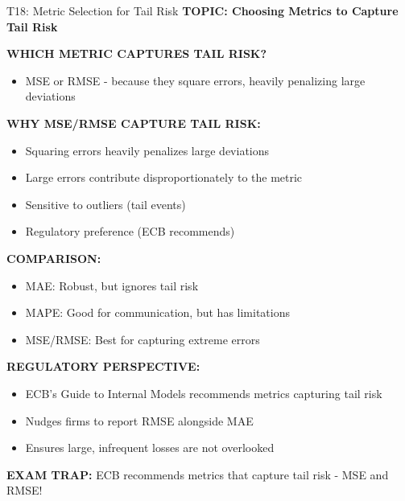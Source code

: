 \documentclass[8pt]{beamer}
\begin{document}
	\begin{frame}{T18: Metric Selection for Tail Risk}
		\fontsize{6.5}{7.5}\selectfont
		\textbf{TOPIC: Choosing Metrics to Capture Tail Risk}
		
		\vspace{0.1cm}
		\textbf{WHICH METRIC CAPTURES TAIL RISK?}
		\begin{itemize}
			\item \textcolor{myblue}{MSE or RMSE} - because they square errors, heavily penalizing large deviations
		\end{itemize}
		
		\vspace{0.1cm}
		\textbf{WHY MSE/RMSE CAPTURE TAIL RISK:}
		\begin{itemize}
			\item Squaring errors heavily penalizes large deviations
			\item Large errors contribute disproportionately to the metric
			\item Sensitive to outliers (tail events)
			\item Regulatory preference (ECB recommends)
		\end{itemize}
		
		\vspace{0.1cm}
		\textbf{COMPARISON:}
		\begin{itemize}
			\item \textcolor{myblue}{MAE:} Robust, but ignores tail risk
			\item \textcolor{myblue}{MAPE:} Good for communication, but has limitations
			\item \textcolor{myblue}{MSE/RMSE:} Best for capturing extreme errors
		\end{itemize}
		
		\vspace{0.1cm}
		\textbf{REGULATORY PERSPECTIVE:}
		\begin{itemize}
			\item ECB's Guide to Internal Models recommends metrics capturing tail risk
			\item Nudges firms to report RMSE alongside MAE
			\item Ensures large, infrequent losses are not overlooked
		\end{itemize}
		
		\textcolor{myred}{\textbf{EXAM TRAP:}} ECB recommends metrics that \textcolor{myblue}{capture tail risk} - MSE and RMSE!
	\end{frame}
	
\end{document}
